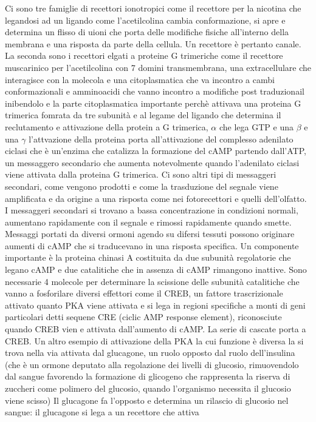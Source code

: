 Ci sono tre famiglie di recettori ionotropici come il recettore per la nicotina che legandosi ad un ligando come l'acetilcolina cambia conformazione, si apre e determina un flisso di 
uioni che porta delle modifiche fisiche all'interno della membrana e una risposta da parte della cellula. Un recettore \`e pertanto canale. La seconda sono i recettori elgati a proteine
G trimeriche come il recettore muscarinico per l'acetilcolina con 7 domini transmembrana, una extracellulare che interagisce con la molecola e una citoplasmatica che va incontro a 
cambi conformazionali e amminoacidi che vanno incontro a modifiche post traduzionail  inibendolo e la parte citoplasmatica importante perch\`e attivava una proteina G trimerica fomrata
da tre subunit\`a e al legame del ligando che determina il reclutamento e attivazione della protein a G trimerica, $\alpha$ che lega GTP e una $\beta$ e una $\gamma$ l'attvazione della
proteina porta all'attivazione del complesso adenilato ciclasi che \`e un'enzima che catalizza la formazione del cAMP partendo dall'ATP, un messaggero secondario che aumenta notevolmente
quando l'adenilato ciclasi viene attivata dalla proteina G trimerica. Ci sono altri tipi di messaggeri secondari, come vengono prodotti e come la trasduzione del segnale viene amplificata
e da origine a una risposta come nei fotorecettori e quelli dell'olfatto. I messaggeri secondari si trovano a bassa concentrazione in condizioni normali, aumentano rapidamente con il 
segnale e rimossi rapidamente quando smette. Messaggi portati da diversi ormoni agendo su difersi tessuti possono originare aumenti di cAMP che si traducevano in una risposta specifica. 
Un componente importante \`e la proteina chinasi A costituita da due subunit\`a regolatorie che legano cAMP e due catalitiche che in assenza di cAMP rimangono inattive. Sono necessarie 
4 molecole per determinare la scissione delle subunit\`a catalitiche che vanno a fosforilare diversi effettori come il CREB, un fattore trascrizionale attivato quanto PKA viene attivata 
e si lega in regioni specifiche a monti di geni particolari detti sequene CRE (ciclic AMP response element), riconosciute quando CREB vien e attivata dall'aumento di cAMP. La serie di 
cascate porta a CREB. Un altro esempio di attivazione della PKA la cui funzione \`e diversa la si trova nella via attivata dal glucagone, un ruolo opposto dal ruolo dell'insulina (che
\`e un ormone deputato alla regolazione dei livelli di glucosio, rimuovendolo dal sangue favorendo la formazione di glicogeno che rappresenta la riserva di zuccheri come polimero del 
glucosio, quando l'organismo necessita il glucosio viene scisso) Il glucagone fa l'opposto e determina un rilascio di glucosio nel sangue: il glucagone si lega a un recettore che attiva
